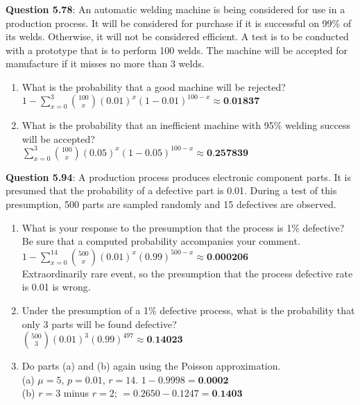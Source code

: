 \documentclass{article}
\begin{document}
    \textbf{Question 5.78}: An automatic welding machine is being considered
    for use in a production process. It will be considered 
    for purchase if it is successful on 99\% of its welds. 
    Otherwise, it will not be considered efficient.
    A test is to be conducted with a prototype that is to
    perform 100 welds. The machine will be accepted for
    manufacture if it misses no more than 3 welds.
        \begin{enumerate}[label = (\alph*)]
            \item What is the probability that a good machine will
            be rejected?\\
            $1 - \sum_{x=0}^{3}\binom{100}{x}(0.01)^x(1-0.01)^{100-x} \approx \textbf{0.01837}$
            \item What is the probability that an inefficient machine with 95\% welding success will be accepted?\\
            $\sum_{x=0}^{3}\binom{100}{x}(0.05)^x(1-0.05)^{100-x} \approx \textbf{0.257839}$
        \end{enumerate}
    \textbf{Question 5.94}: A production process produces electronic component 
    parts. It is presumed that the probability of a
    defective part is 0.01. During a test of this presumption, 
    500 parts are sampled randomly and 15 defectives
    are observed.
        \begin{enumerate}[label = (\alph*)]
            \item What is your response to the presumption that the
            process is 1\% defective? Be sure that a computed
            probability accompanies your comment.\\
            $1 - \sum_{x=0}^{14}\binom{500}{x}(0.01)^x(0.99)^{500-x} \approx \textbf{0.000206}$\\
            Extraordinarily rare event, so the presumption that the process defective rate is 0.01 is wrong.
            \item Under the presumption of a 1\% defective process,
            what is the probability that only 3 parts will be
            found defective?\\
            $\binom{500}{3}(0.01)^3(0.99)^497 \approx \textbf{0.14023}$
            \item Do parts (a) and (b) again using the Poisson approximation.\\
            (a) $\mu = 5$, $p = 0.01$, $r = 14$. $1 - 0.9998 = \textbf{0.0002}$\\
            (b) $r = 3$ minus $r = 2$; $= 0.2650 - 0.1247 = \textbf{0.1403}$
        \end{enumerate}
\end{document}
